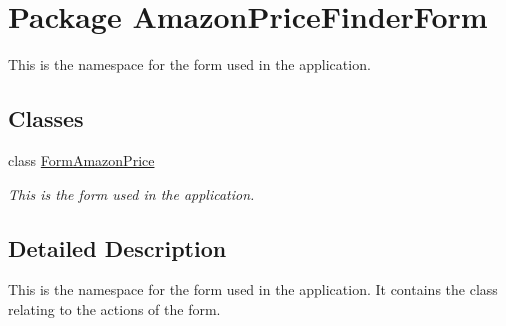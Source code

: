 \hypertarget{namespace_amazon_price_finder_form}{\section{Package Amazon\-Price\-Finder\-Form}
\label{namespace_amazon_price_finder_form}
}


This is the namespace for the form used in the application.  


\subsection*{Classes}
\begin{DoxyCompactItemize}
\item 
class \hyperlink{class_amazon_price_finder_form_1_1_form_amazon_price}{Form\-Amazon\-Price}
\begin{DoxyCompactList}\small\item\em This is the form used in the application. \end{DoxyCompactList}\end{DoxyCompactItemize}


\subsection{Detailed Description}
This is the namespace for the form used in the application. It contains the class relating to the actions of the form. 